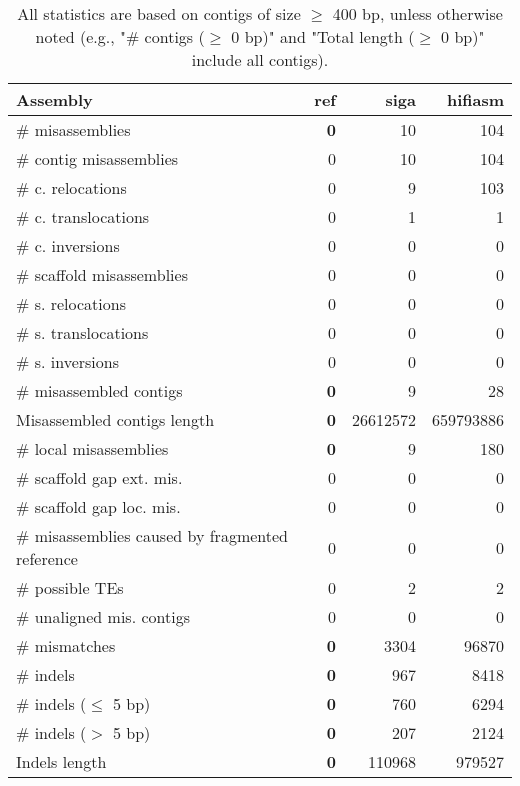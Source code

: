 \documentclass[12pt,a4paper]{article}
\begin{document}
\begin{table}[ht]
\begin{center}
\caption{All statistics are based on contigs of size $\geq$ 400 bp, unless otherwise noted (e.g., "\# contigs ($\geq$ 0 bp)" and "Total length ($\geq$ 0 bp)" include all contigs).}
\begin{tabular}{|l*{3}{|r}|}
\hline
Assembly & ref & siga & hifiasm \\ \hline
\# misassemblies & {\bf 0} & 10 & 104 \\ \hline
\hspace{2mm}\# contig misassemblies & 0 & 10 & 104 \\ \hline
\hspace{5mm}\# c. relocations & 0 & 9 & 103 \\ \hline
\hspace{5mm}\# c. translocations & 0 & 1 & 1 \\ \hline
\hspace{5mm}\# c. inversions & 0 & 0 & 0 \\ \hline
\hspace{2mm}\# scaffold misassemblies & 0 & 0 & 0 \\ \hline
\hspace{5mm}\# s. relocations & 0 & 0 & 0 \\ \hline
\hspace{5mm}\# s. translocations & 0 & 0 & 0 \\ \hline
\hspace{5mm}\# s. inversions & 0 & 0 & 0 \\ \hline
\# misassembled contigs & {\bf 0} & 9 & 28 \\ \hline
Misassembled contigs length & {\bf 0} & 26612572 & 659793886 \\ \hline
\# local misassemblies & {\bf 0} & 9 & 180 \\ \hline
\# scaffold gap ext. mis. & 0 & 0 & 0 \\ \hline
\# scaffold gap loc. mis. & 0 & 0 & 0 \\ \hline
\# misassemblies caused by fragmented reference & 0 & 0 & 0 \\ \hline
\# possible TEs & 0 & 2 & 2 \\ \hline
\# unaligned mis. contigs & 0 & 0 & 0 \\ \hline
\# mismatches & {\bf 0} & 3304 & 96870 \\ \hline
\# indels & {\bf 0} & 967 & 8418 \\ \hline
\hspace{5mm}\# indels ($\leq$ 5 bp) & {\bf 0} & 760 & 6294 \\ \hline
\hspace{5mm}\# indels ($>$ 5 bp) & {\bf 0} & 207 & 2124 \\ \hline
Indels length & {\bf 0} & 110968 & 979527 \\ \hline
\end{tabular}
\end{center}
\end{table}
\end{document}
